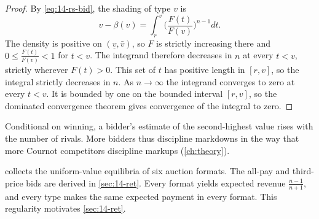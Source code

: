 \begin{proof}
By \eqref{eq:14-rs-bid}, the shading of type $v$ is
\[
v-\beta(v)=\int_r^v\Big(\frac{F(t)}{F(v)}\Big)^{n-1}dt.
\]
The density is positive on $(\underline v,\bar v)$, so $F$ is strictly increasing there and $0\le\frac{F(t)}{F(v)}<1$ for $t<v$. The integrand therefore decreases in $n$ at every $t<v$, strictly wherever $F(t)>0$. This set of $t$ has positive length in $[r,v]$, so the integral strictly decreases in $n$. As $n\to\infty$ the integrand converges to zero at every $t<v$. It is bounded by one on the bounded interval $[r,v]$, so the dominated convergence theorem gives convergence of the integral to zero.
\end{proof}

Conditional on winning, a bidder's estimate of the second-highest value rises with the number of rivals. More bidders thus discipline markdowns in the way that more Cournot competitors discipline markups (\cref{ch:theory}).

 collects the uniform-value equilibria of six auction formats. The all-pay and third-price bids are derived in \cref{sec:14-ret}. Every format yields expected revenue $\frac{n-1}{n+1}$, and every type makes the same expected payment in every format. This regularity motivates \cref{sec:14-ret}.

